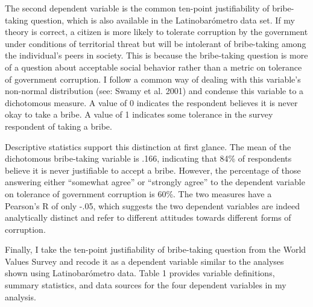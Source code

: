\documentclass[11pt,]{article}
\begin{document}
The second dependent variable is the common ten-point justifiability of
bribe-taking question, which is also available in the Latinobarómetro
data set. If my theory is correct, a citizen is more likely to tolerate
corruption by the government under conditions of territorial threat but
will be intolerant of bribe-taking among the individual's peers in
society. This is because the bribe-taking question is more of a question
about acceptable social behavior rather than a metric on tolerance of
government corruption. I follow a common way of dealing with this
variable's non-normal distribution (see: Swamy et al. 2001) and condense
this variable to a dichotomous measure. A value of 0 indicates the
respondent believes it is never okay to take a bribe. A value of 1
indicates some tolerance in the survey respondent of taking a bribe.

Descriptive statistics support this distinction at first glance. The
mean of the dichotomous bribe-taking variable is .166, indicating that
84\% of respondents believe it is never justifiable to accept a bribe.
However, the percentage of those answering either ``somewhat agree'' or
``strongly agree'' to the dependent variable on tolerance of government
corruption is 60\%. The two measures have a Pearson's R of only -.05,
which suggests the two dependent variables are indeed analytically
distinct and refer to different attitudes towards different forms of
corruption.

Finally, I take the ten-point justifiability of bribe-taking question
from the World Values Survey and recode it as a dependent variable
similar to the analyses shown using Latinobarómetro data. Table 1
provides variable definitions, summary statistics, and data sources for
the four dependent variables in my analysis.
\end{document}
